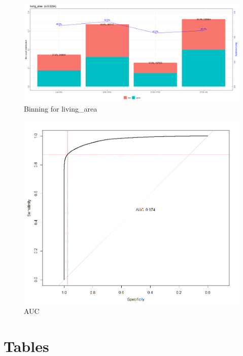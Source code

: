 \documentclass[
]{article}
\begin{document}
\begin{figure}
\centering
\includegraphics{.//WOE140.png}
\caption{\label{fig:woe140} Binning for living\_area}
\end{figure}

\begin{figure}
\centering
\includegraphics{.//AUC140.png}
\caption{\label{fig:auc140} AUC}
\end{figure}

\hypertarget{tables}{%
\section{Tables}\label{tables}}
\end{document}
